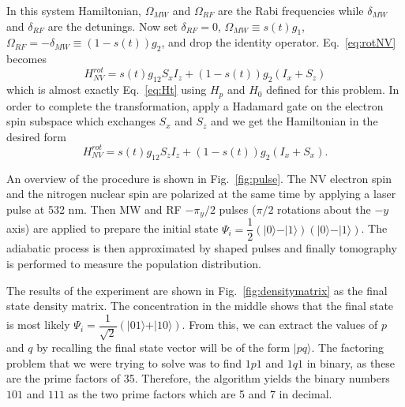 \documentclass[%
 reprint,
 amsmath,amssymb,
 aps,
]{revtex4-1}
\begin{document}
	In this system Hamiltonian, $\Omega_{MW}$ and $\Omega_{RF}$ are the Rabi frequencies while $\delta_{MW}$ and $\delta_{RF}$ are the detunings. Now set $\delta_{RF}=0$, $\Omega_{MW}\equiv s(t)g_1$, $\Omega_{RF}=-\delta_{MW}\equiv \left(1-s(t)\right)g_2$, and drop the identity operator. Eq.~\ref{eq:rotNV} becomes
	\begin{equation}
		H^{rot}_{NV} = s(t)g_12S_xI_z + \left(1-s(t)\right)g_2\left(I_x + S_z\right)
	\end{equation}
which is almost exactly Eq.~\ref{eq:Ht} using $H_p$ and $H_0$ defined for this problem. In order to complete the transformation, apply a Hadamard gate on the electron spin subspace which exchanges $S_x$ and $S_z$ and we get the Hamiltonian in the desired form
	\begin{equation}
		H^{rot}_{NV} = s(t)g_12S_zI_z + \left(1-s(t)\right)g_2\left(I_x + S_x\right).
	\end{equation}	
	
	An overview of the procedure is shown in Fig.~\ref{fig:pulse}. The NV electron spin and the nitrogen nuclear spin are polarized at the same time by applying a laser pulse at 532 nm. Then MW and RF $-\pi_y/2$ pulses ($\pi/2$ rotations about the $-y$ axis) are applied to prepare the initial state $\Psi_i = \dfrac{1}{2}\left(\vert 0 \rangle - \vert 1 \rangle   \right)\left(\vert 0 \rangle - \vert 1 \rangle   \right)$. The adiabatic process is then approximated by shaped pulses and finally tomography is performed to measure the population distribution. 

	The results of the experiment are shown in Fig.~\ref{fig:densitymatrix} as the final state density matrix. The concentration in the middle shows that the final state is most likely $\Psi_i = \dfrac{1}{\sqrt{2}}\left(\vert 01 \rangle + \vert 10 \rangle   \right)$. From this, we can extract the values of $p$ and $q$ by recalling the final state vector will be of the form $\vert pq \rangle$. The factoring problem that we were trying to solve was to find $1p1$ and $1q1$ in binary, as these are the prime factors of 35. Therefore, the algorithm yields the binary numbers $101$ and $111$ as the two prime factors which are 5 and 7 in decimal.
	
\end{document}
